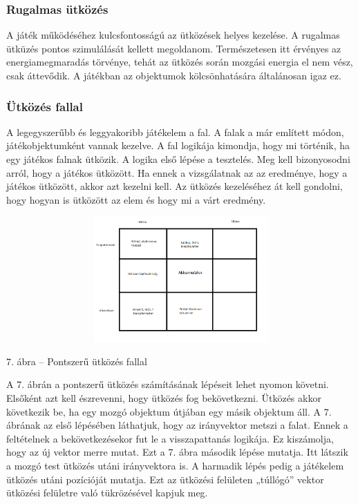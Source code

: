 \documentclass[]{article}
\begin{document}
\hypertarget{rugalmas-uxfctkuxf6zuxe9s}{%
\subsubsection{Rugalmas ütközés}\label{rugalmas-uxfctkuxf6zuxe9s}}

A játék működéséhez kulcsfontosságú az ütközések helyes kezelése. A
rugalmas ütküzés pontos szimulálását kellett megoldanom. Természetesen
itt érvényes az energiamegmaradás törvénye, tehát az ütközés során
mozgási energia el nem vész, csak áttevődik. A játékban az objektumok
kölcsönhatására általánosan igaz ez.

\hypertarget{uxfctkuxf6zuxe9s-fallal}{%
\subsubsection{Ütközés fallal}\label{uxfctkuxf6zuxe9s-fallal}}

A legegyszerűbb és leggyakoribb játékelem a fal. A falak a már említett
módon, játékobjektumként vannak kezelve. A fal logikája kimondja, hogy
mi történik, ha egy játékos falnak ütközik. A logika első lépése a
tesztelés. Meg kell bizonyosodni arról, hogy a játékos ütközött. Ha
ennek a vizsgálatnak az az eredménye, hogy a játékos ütközött, akkor azt
kezelni kell. Az ütközés kezeléséhez át kell gondolni, hogy hogyan is
ütközött az elem és hogy mi a várt eredmény.

\includegraphics[width=5.51181in,height=1.89375in]{media/image3.png}

7. ábra -- Pontszerű ütközés fallal

A 7. ábrán a pontszerű ütközés számításának lépéseit lehet nyomon
követni. Elsőként azt kell észrevenni, hogy ütközés fog bekövetkezni.
Ütközés akkor következik be, ha egy mozgó objektum útjában egy másik
objektum áll. A 7. ábrának az első lépésében láthatjuk, hogy az
irányvektor metszi a falat. Ennek a feltételnek a bekövetkezésekor fut
le a visszapattanás logikája. Ez kiszámolja, hogy az új vektor merre
mutat. Ezt a 7. ábra második lépése mutatja. Itt látszik a mozgó test
ütközés utáni irányvektora is. A harmadik lépés pedig a játékelem
ütközés utáni pozícióját mutatja. Ezt az ütközési felületen „túllógó''
vektor ütközési felületre való tükrözésével kapjuk meg.
\end{document}
